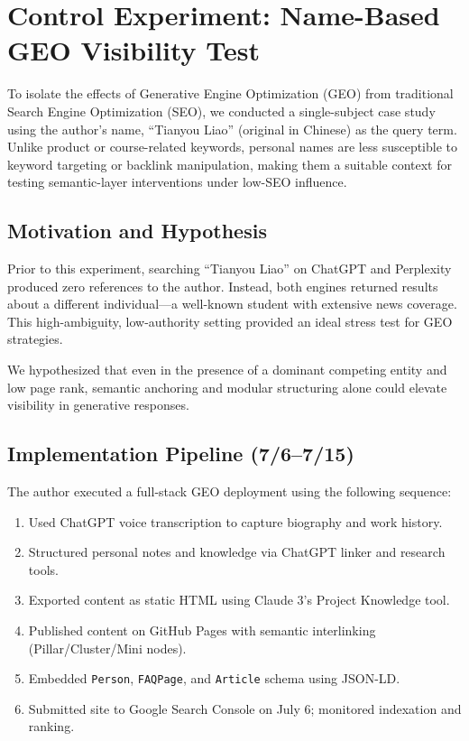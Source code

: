 \section{Control Experiment: Name-Based GEO Visibility Test}

To isolate the effects of Generative Engine Optimization (GEO) from traditional Search Engine Optimization (SEO), we conducted a single-subject case study using the author’s name, “Tianyou Liao” (original in Chinese) as the query term. Unlike product or course-related keywords, personal names are less susceptible to keyword targeting or backlink manipulation, making them a suitable context for testing semantic-layer interventions under low-SEO influence.

\subsection{Motivation and Hypothesis}

Prior to this experiment, searching “Tianyou Liao” on ChatGPT and Perplexity produced zero references to the author. Instead, both engines returned results about a different individual---a well-known student with extensive news coverage. This high-ambiguity, low-authority setting provided an ideal stress test for GEO strategies.

We hypothesized that even in the presence of a dominant competing entity and low page rank, semantic anchoring and modular structuring alone could elevate visibility in generative responses.

\subsection{Implementation Pipeline (7/6--7/15)}

The author executed a full-stack GEO deployment using the following sequence:

\begin{enumerate}
  \item Used ChatGPT voice transcription to capture biography and work history.
  \item Structured personal notes and knowledge via ChatGPT linker and research tools.
  \item Exported content as static HTML using Claude 3’s Project Knowledge tool.
  \item Published content on GitHub Pages with semantic interlinking (Pillar/Cluster/Mini nodes).
  \item Embedded \texttt{Person}, \texttt{FAQPage}, and \texttt{Article} schema using JSON-LD.
  \item Submitted site to Google Search Console on July 6; monitored indexation and ranking.
\end{enumerate}

